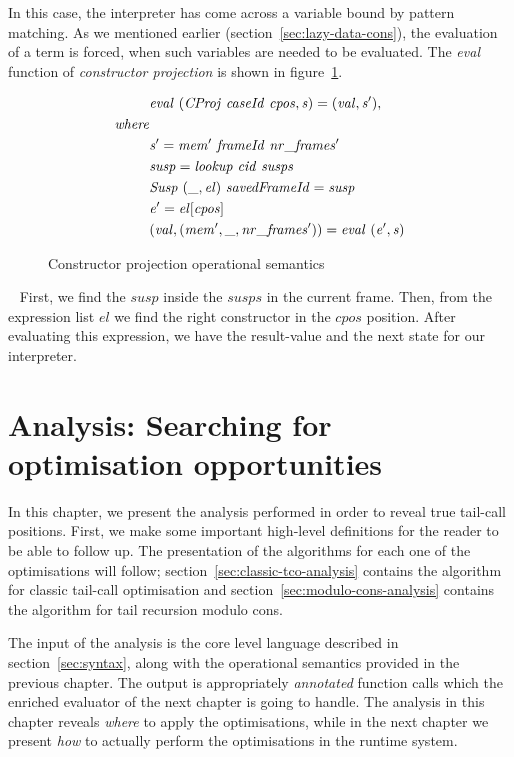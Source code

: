 \documentclass[diploma]{softlab-thesis}
\begin{document}
In this case, the interpreter has come across a variable bound by 
pattern matching. As we mentioned earlier (section~\ref{sec:lazy-data-cons}), the evaluation
of a term is forced, when such variables are needed to be evaluated.
The \textit{eval} function of \textit{constructor projection} is shown in 
figure~\ref{fig:consproj}. ~
\begin{figure}[htp]
  \begin{align*}
    & \mathit{eval \hfill\ (CProj \hfill\ caseId \hfill\ cpos, s) = (val, s'),} \\
    \mathit{where } \\
    & \mathit{s' = mem' \hfill\ frameId \hfill\ nr\_frames'} \\
    & \mathit{susp = lookup \hfill\ cid \hfill\ susps} \\
    & \mathit{Susp \hfill\ (\_, el) \hfill\ savedFrameId = susp} \\
    & \mathit{e' = el[cpos]} \\
    & \mathit{(val, (mem', \_, nr\_frames')) = eval \hfill\ (e', s)}
  \end{align*}
\caption{Constructor projection operational semantics\label{fig:consproj}}
\end{figure} ~
First, we find the $\mathit{susp}$ inside the $\mathit{susps}$ in the current frame. Then, 
from the expression list $\mathit{el}$ we find the right constructor in the $\mathit{cpos}$ 
position. After evaluating this expression, we have the result-value and the next state 
for our interpreter.

\chapter{Analysis: Searching for optimisation opportunities}
\label{ch:analysis}

In this chapter, we present the analysis performed in order to reveal true tail-call positions.
First, we make some important high-level definitions for the reader to be able to follow up. 
The presentation of the algorithms for each one of the optimisations will follow; section~\ref{sec:classic-tco-analysis} contains 
the algorithm for classic tail-call optimisation and section~\ref{sec:modulo-cons-analysis} contains the algorithm for tail recursion modulo cons.

The input of the analysis is the core level language described in section~\ref{sec:syntax}, 
along with the operational semantics provided in the previous chapter. The output is appropriately 
\textit{annotated} function calls which the enriched evaluator of the next chapter is going to handle.
The analysis in this chapter reveals \textit{where} to apply the optimisations, while 
in the next chapter we present \textit{how} to actually perform the optimisations in the runtime system.
\end{document}
